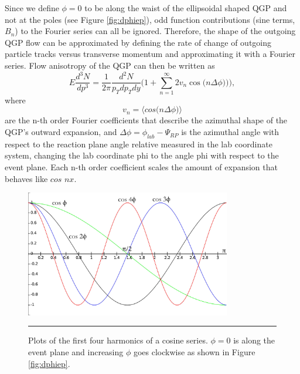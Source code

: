 Since we define $\phi=0$ to be along the waist of the ellipsoidal shaped QGP and not at the poles (see Figure \ref{fig:dphiep}), odd function contributions (sine terms, $B_{n}$) to the Fourier series can all be ignored. Therefore, the shape of the outgoing QGP flow can be approximated by defining the rate of change of outgoing particle tracks versus transverse momentum and approximating it with a Fourier series. Flow anisotropy of the QGP can then be written as
\begin{equation}
E \frac{d^{3}N}{dp^{3}} = \frac{1}{2 \pi} \frac{d^{2}N}{p_{T} dp_{T}dy}\Big( 1 + \sum^{\infty}_{n=1} 2 v_{n} \cos\big(n \Delta \phi)\big) \Big),
\end{equation}
where
\begin{equation}
v_{n} = \bigg \langle cos \Big( n \Delta\phi \Big) \bigg \rangle
\end{equation}
are the n-th order Fourier coefficients that describe the azimuthal shape of the QGP's outward expansion, and $\Delta \phi = \phi_{lab} - \Psi_{RP}$ is the azimuthal angle with respect to the reaction plane angle relative measured in the lab coordinate system, changing the lab coordinate phi to the angle phi with respect to the event plane. Each n-th order coefficient scales the amount of expansion that behaves like $cos$ $nx$.

\begin{figure}[htbp!]
  \centering
    \includegraphics[width=0.8\textwidth]{Figures/fouriercosines.jpg}
    \rule{35em}{0.5pt}
  \caption[Plots of the first four harmonics of a cosine series.]{Plots of the first four harmonics of a cosine series. $\phi=0$ is along the event plane and increasing $\phi$ goes clockwise as shown in Figure \ref{fig:dphiep}.}
  \label{fig:fouriercosines}
\end{figure}

